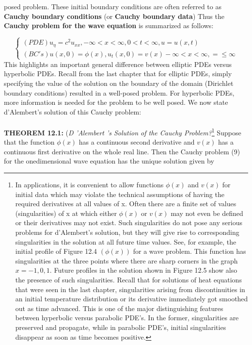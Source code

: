 \documentclass[../main.tex]{subfiles}
\begin{document}
\newpage
posed problem. These initial boundary conditions are often referred to as \textbf{Cauchy
boundary conditions}  (or \textbf{Cauchy boundary data}) Thus the \textbf{Cauchy problem
for the wave equation} is summarized as follows: 

\begin{equation}
\left\{\begin{array}{ll}
(PDE) u_\eta=c^2u_{xx}, -\infty<x<\infty, 0<t<\infty, u=u(x,t)\\
(BC's) u(x,0)=\phi(x), u_t(x,0)=v(x)-\infty<x<\infty ,=\leqslant \infty
\end{array} \right.
\label{eq:eps}
\end{equation}
This highlights an important general difference between elliptic PDEs versus
hyperbolic PDEs. Recall from the last chapter that for elliptic PDEs, simply
specifying the value of the solution on the boundary of the domain (Dirichlet
boundary conditions) resulted in a well-posed problem. For hyperbolic PDEs,
more information is needed for the problem to be well posed. We now state
d'Alembert's solution of this Cauchy problem: 
\\
\\
\textbf{THEOREM 12.1:}
(\emph{D 'Alembert 's Solution of the Cauchy Problem?}\footnote
{ In applications, it is convenient to allow functions $\phi(x)$ and $v(x)$ for initial data which may violate
the technical assumptions of having the required derivatives at all values of x. Often there are a finite
set of values (singularities) of x at which either $\phi(x)$ or $v(x)$ may not even be defined or their
derivatives may not exist. Such singularities do not pose any serious problems for d'Alembert's
solution, but they will give rise to corresponding singularities in the solution at all future time values.
See, for example, the initial profile of Figure 12.4 $(\phi(x))$ for a wave problem.  This function has
singularities at the three points where there are sharp corners in the graph $x = -1 , 0, 1$. Future profiles
in the solution shown in Figure 12.5 show also the presence of such singularities. Recall that for
solutions of heat equations that were seen in the last chapter, singularities arising from discontinuities
in an initial temperature distribution or its derivative immediately got smoothed out as time advanced.
This is one of the major distinguishing features between hyperbolic versus parabolic PDE's. In the
former, singularities are preserved and propagate, while in parabolic PDE's, initial singularities
disappear as soon as time becomes positive.} 
Suppose that
the function $\phi(x)$ has a continuous second derivative and $v(x)$ has a continuous
first derivative on the whole real line. Then the Cauchy problem (9) for the onedimensional wave equation has the unique solution given by 
\end{document}
